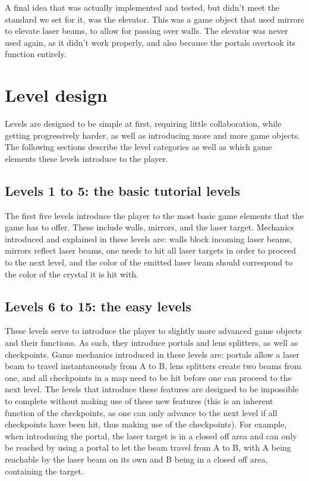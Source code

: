 			A final idea that was actually implemented and tested, but didn't
			meet the standard we set for it, was the elevator. This was a
			game object that used mirrors to elevate laser beams, to allow for
			passing over walls. The elevator was never used again, as it didn't
			work properly, and also because the portals overtook its function
			entirely.
			
	\section{Level design} \label{sec:leveldesign}
		Levels are designed to be simple at first, requiring little collaboration,
		while getting progressively harder, as well as introducing more and more
		game objects. The following sections describe the level categories as
		well as which game elements these levels introduce to the player.

		\subsection{Levels 1 to 5: the basic tutorial levels} \label{ssec:basiclevels}
			The first five levels introduce the player to the most basic game
			elements that the game has to offer. These include walls, mirrors,
			and the laser target. Mechanics introduced and explained in these
			levels are: walls block incoming laser beams, mirrors reflect
			laser beams, one needs to hit all laser targets in order
			to proceed to the next level, and the color of the emitted laser
			beam should correspond to the color of the crystal it is hit with.
			
		\subsection{Levels 6 to 15: the easy levels} \label{ssec: easylevels}
			These levels serve to introduce the player to slightly more advanced
			game objects and their functions. As such, they introduce portals
			and lens splitters, as well as checkpoints. Game mechanics introduced
			in these levels are: portals allow a laser beam to travel instantaneously
			from A to B, lens splitters create two beams from one, and all 
			checkpoints in a map need to be hit before one can proceed to the 
			next level. The levels that introduce these features are designed 
			to be impossible to complete without making use of these new features 
			(this is an inherent function of the checkpoints, as one can only 
			advance to the next level if all checkpoints have been hit, thus 
			making use of the checkpoints). For example, when introducing the 
			portal, the laser target is in a closed off area and can only be 
			reached by using a portal to let the beam travel from A to B, with A
			being reachable by the laser beam on its own and B being in a closed
			off area, containing the target.
			
